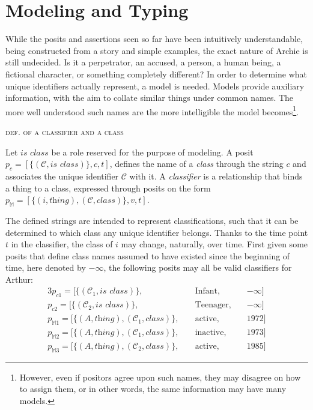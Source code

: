 \documentclass[sfsidenotes,nobib,twoside,symmetric]{tufte-handout}
\newcounter{majorcount}
\newcommand{\deffy}[3]{
	\vspace{2ex}
	\refstepcounter{majorcount} 
	\noindent\textsc{#1}%
	\\\begin{small}
	\noindent #2%
	\label{Def:#3}
	\end{small}
	\vspace{2ex}
}
\begin{document}
\section{Modeling and Typing}
%
While the posits and assertions seen so far have been intuitively understandable, being constructed from a story and simple examples, the exact nature of Archie is still undecided. Is it a perpetrator, an accused, a person, a human being, a fictional character, or something completely different? In order to determine what unique identifiers actually represent, a model is needed. Models provide auxiliary information, with the aim to collate similar things under common names. The more well understood such names are the more intelligible the model becomes\footnote{However, even if positors agree upon such names, they may disagree on how to assign them, or in other words, the same information may have many models.}.

\deffy{def. of a classifier and a class}{%
Let $\textit{is class}$ be a role reserved for the purpose of modeling. A posit $p_c = [\{(\mathcal{C}, \textit{is class})\}, c, t]$, defines the name of a \emph{class} through the string $c$ and associates the unique identifier $\mathcal{C}$ with it. A \emph{classifier} is a relationship that binds a thing to a class, expressed through posits on the form $p_{\mathbb{M}} = [\{(i, \textit{thing}), (\mathcal{C}, \textit{class})\}, v, t]$.
}{classifier}

The defined strings are intended to represent classifications, such that it can be determined to which class any unique identifier belongs. Thanks to the time point $t$ in the classifier, the class of $i$ may change, naturally, over time. First given some posits that define class names assumed to have existed since the beginning of time, here denoted by $-\infty$, the following posits may all be valid classifiers for Arthur: 
\begin{alignat*}{3}
p_{c1} = [\{(\mathcal{C}_1, \textit{is class})\},\;&& \textrm{Infant},\;&& -\infty] \\
p_{c2} = [\{(\mathcal{C}_2, \textit{is class})\},\;&& \textrm{Teenager},\;&& -\infty] \\
p_{\mathbb{M}1} = [\{(A, \textit{thing}), (\mathcal{C}_1, \textit{class})\},\;&& \textrm{active},\;&& \textrm{1972}] \\
p_{\mathbb{M}2} = [\{(A, \textit{thing}), (\mathcal{C}_1, \textit{class})\},\;&& \textrm{inactive},\;&& \textrm{1973}] \\
p_{\mathbb{M}3} = [\{(A, \textit{thing}), (\mathcal{C}_2, \textit{class})\},\;&& \textrm{active},\;&& \textrm{1985}] 
\end{alignat*}
\end{document}

